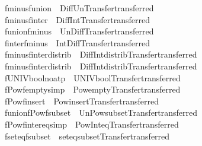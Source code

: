 \begin{isabellebody}
\isamarkupfalse%
\ fminus{\isacharunderscore}funion\ {\isacharequal}\ Diff{\isacharunderscore}Un{\isacharbrackleft}Transfer{\isachardot}transferred{\isacharbrackright}\isanewline
{}\isamarkupfalse%
\ fminus{\isacharunderscore}finter\ {\isacharequal}\ Diff{\isacharunderscore}Int{\isacharbrackleft}Transfer{\isachardot}transferred{\isacharbrackright}\isanewline
{}\isamarkupfalse%
\ funion{\isacharunderscore}fminus\ {\isacharequal}\ Un{\isacharunderscore}Diff{\isacharbrackleft}Transfer{\isachardot}transferred{\isacharbrackright}\isanewline
{}\isamarkupfalse%
\ finter{\isacharunderscore}fminus\ {\isacharequal}\ Int{\isacharunderscore}Diff{\isacharbrackleft}Transfer{\isachardot}transferred{\isacharbrackright}\isanewline
{}\isamarkupfalse%
\ fminus{\isacharunderscore}finter{\isacharunderscore}distrib\ {\isacharequal}\ Diff{\isacharunderscore}Int{\isacharunderscore}distrib{\isacharbrackleft}Transfer{\isachardot}transferred{\isacharbrackright}\isanewline
{}\isamarkupfalse%
\ fminus{\isacharunderscore}finter{\isacharunderscore}distrib{}\ {\isacharequal}\ Diff{\isacharunderscore}Int{\isacharunderscore}distrib{}{\isacharbrackleft}Transfer{\isachardot}transferred{\isacharbrackright}\isanewline
{}\isamarkupfalse%
\ fUNIV{\isacharunderscore}bool{\isacharbrackleft}no{\isacharunderscore}atp{\isacharbrackright}\ {\isacharequal}\ UNIV{\isacharunderscore}bool{\isacharbrackleft}Transfer{\isachardot}transferred{\isacharbrackright}\isanewline
{}\isamarkupfalse%
\ fPow{\isacharunderscore}fempty{\isacharbrackleft}simp{\isacharbrackright}\ {\isacharequal}\ Pow{\isacharunderscore}empty{\isacharbrackleft}Transfer{\isachardot}transferred{\isacharbrackright}\isanewline
{}\isamarkupfalse%
\ fPow{\isacharunderscore}finsert\ {\isacharequal}\ Pow{\isacharunderscore}insert{\isacharbrackleft}Transfer{\isachardot}transferred{\isacharbrackright}\isanewline
{}\isamarkupfalse%
\ funion{\isacharunderscore}fPow{\isacharunderscore}fsubset\ {\isacharequal}\ Un{\isacharunderscore}Pow{\isacharunderscore}subset{\isacharbrackleft}Transfer{\isachardot}transferred{\isacharbrackright}\isanewline
{}\isamarkupfalse%
\ fPow{\isacharunderscore}finter{\isacharunderscore}eq{\isacharbrackleft}simp{\isacharbrackright}\ {\isacharequal}\ Pow{\isacharunderscore}Int{\isacharunderscore}eq{\isacharbrackleft}Transfer{\isachardot}transferred{\isacharbrackright}\isanewline
{}\isamarkupfalse%
\ fset{\isacharunderscore}eq{\isacharunderscore}fsubset\ {\isacharequal}\ set{\isacharunderscore}eq{\isacharunderscore}subset{\isacharbrackleft}Transfer{\isachardot}transferred{\isacharbrackright}\isanewline

\end{isabellebody}
